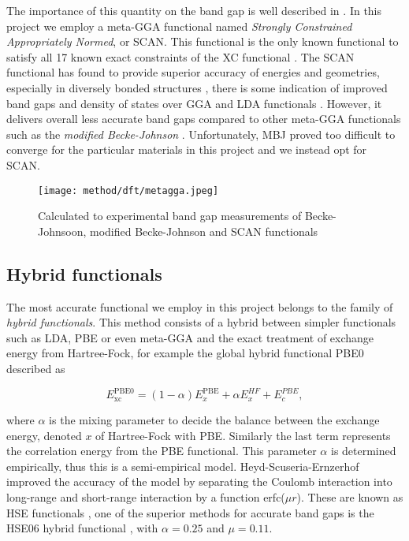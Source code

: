 The importance of this quantity on the band gap is well described in \cite{xc_kineticEnergy}. In this project we employ a meta-GGA functional named \textit{Strongly Constrained Appropriately Normed}, or SCAN. This functional is the only known functional to satisfy all 17 known exact constraints of the XC functional \cite{scan}. The SCAN functional has found to provide superior accuracy of energies and geometries, especially in diversely bonded structures \cite{scan_divbond}, there is some indication of improved band gaps and density of states over GGA and LDA functionals \cite{scan_pbe}. However, it delivers overall less accurate band gaps compared to other meta-GGA functionals such as the \textit{modified Becke-Johnson} \cite{mbj}. Unfortunately, MBJ proved too difficult to converge for the particular materials in this project and we instead opt for SCAN. 
\begin{figure}[H]
\centering
\texttt{[image: method/dft/metagga.jpeg]}
\caption{Calculated to experimental band gap measurements of Becke-Johnsoon, modified Becke-Johnson and SCAN functionals \cite{xc_benchmark}}
\end{figure}

\subsection{Hybrid functionals}

The most accurate functional we employ in this project belongs to the family of \textit{hybrid functionals}. This method consists of a hybrid between simpler functionals such as LDA, PBE or even meta-GGA and the exact treatment of exchange energy from Hartree-Fock, for example the global hybrid functional PBE0 \cite{pbe0} described as

\begin{equation}
E_\text{xc} ^\text{PBE0} = (1-\alpha)E_x ^\text{PBE} + \alpha E_x ^{HF} + E_c ^{PBE}, 
\end{equation}

 where $\alpha$ is the mixing parameter to decide the balance between the exchange energy, denoted $x$ of Hartree-Fock with PBE. Similarly the last term represents the correlation energy from the PBE functional. This parameter $\alpha$ is determined empirically, thus this is a semi-empirical model. Heyd-Scuseria-Ernzerhof improved the accuracy of the model by separating the Coulomb interaction into long-range and short-range interaction by a function erfc($\mu r$). These are known as HSE functionals \cite{hse}, one of the superior methods for accurate band gaps is the HSE06 hybrid functional \cite{hse06}, with $\alpha = 0.25$ and $\mu = 0.11$.  
 
